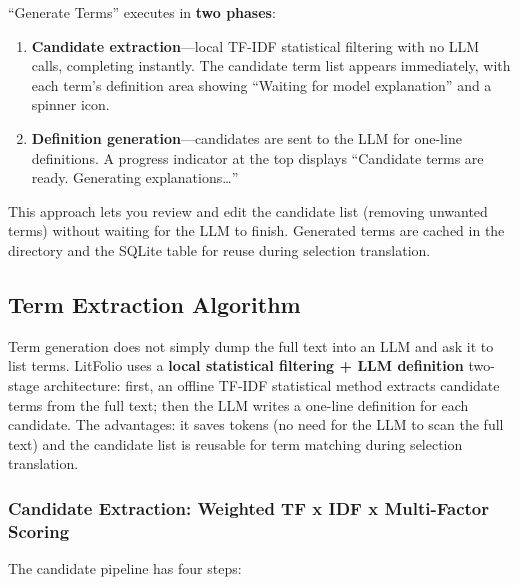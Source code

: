 
``Generate Terms'' executes in \textbf{two phases}:

\begin{enumerate}
  \item \textbf{Candidate extraction}---local TF-IDF statistical filtering with no LLM
    calls, completing instantly. The candidate term list appears immediately, with each
    term's definition area showing ``Waiting for model explanation'' and a spinner icon.
  \item \textbf{Definition generation}---candidates are sent to the LLM for one-line
    definitions. A progress indicator at the top displays ``Candidate terms are ready.
    Generating explanations\ldots''
\end{enumerate}

This approach lets you review and edit the candidate list (removing unwanted terms)
without waiting for the LLM to finish. Generated terms are cached in the
 directory and the SQLite  table for reuse during
selection translation.

\subsection{Term Extraction Algorithm}

Term generation does not simply dump the full text into an LLM and ask it to list
terms. LitFolio uses a \textbf{local statistical filtering + LLM definition} two-stage
architecture: first, an offline TF-IDF statistical method extracts candidate terms
from the full text; then the LLM writes a one-line definition for each candidate.
The advantages: it saves tokens (no need for the LLM to scan the full text) and the
candidate list is reusable for term matching during selection translation.

\subsubsection{Candidate Extraction: Weighted TF x IDF x Multi-Factor Scoring}

The candidate pipeline has four steps:

